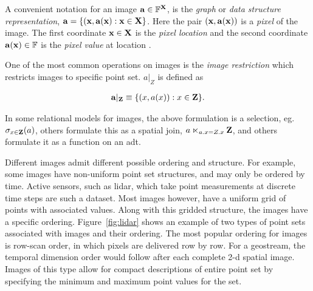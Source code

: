 \documentclass{sig-alternate}
\begin{document}
A convenient notation for an image ${\bf{a}} \in {\ensuremath{\mathbb{F}}}^{{\bf{X}}}$, is
the \emph{graph} or \emph{data structure representation}, ${\bf{a}} =
\{({\bf{x}},{\bf{a}}({\bf{x}}) : {\bf{x}} \in {\ensuremath{\bf{X}}}\}$.  Here the pair
$({\bf{x}},{\bf{a}}({\bf{x}}))$ is a \emph{pixel} of the image.  The first
coordinate ${\bf{x}} \in {\ensuremath{\bf{X}}}$ is the \emph{pixel location} and the
second coordinate ${\bf{a}}({\bf{x}}) \in {\ensuremath{\mathbb{F}}}$ is the \emph{pixel
  value} at location .

One of the most common operations on images is the \emph{image
  restriction} which restricts images to specific point set.  $a|_Z$
is defined as

\begin{gather}
  {\ensuremath{\bf{a}}}|_{\bf{Z}} \equiv \{(x,a(x)): x \in {\ensuremath{\bf{Z}}}\}.
\end{gather}

In some relational models for images, the above formulation is a
selection, eg.  $\sigma_{x \in {\ensuremath{\bf{Z}}}}(a)$, others formulate this as a
spatial join, $a \ltimes_{a.x = Z.x} {\bf{Z}}$, and others formulate it
as a function on an \ac{adt}.

Different images admit different possible ordering and structure.  For
example, some images have non-uniform point set structures, and may
only be ordered by time.  Active sensors, such as lidar, which take
point measurements at discrete time steps are such a dataset.  Most
images however, have a uniform grid of points with associated values.
Along with this gridded structure, the images have a specific
ordering. Figure~\ref{fig:lidar} shows an example of two types of
 point sets associated with images and their ordering.  The most popular
ordering for images is row-scan order, in which pixels are delivered
row by row.  For a geostream, the temporal dimension order would
follow after each complete 2-d spatial image.  Images of this type
allow for compact descriptions of entire point set by specifying the
minimum and maximum point values for the set.
\end{document}
